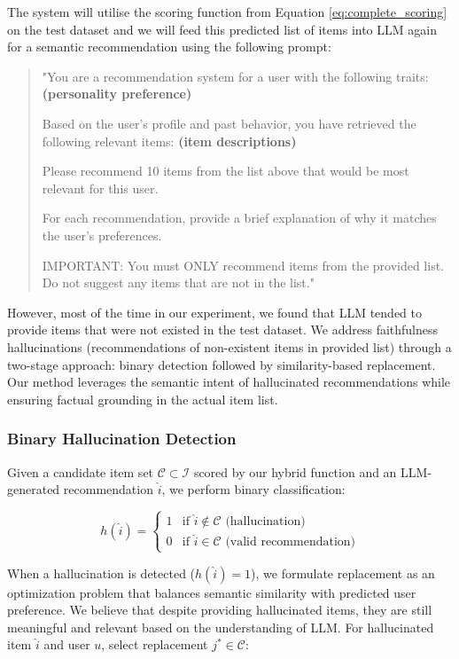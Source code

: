 \documentclass[acmsmall]{acmart}
\begin{document}
The system will utilise the scoring function from Equation \ref{eq:complete_scoring} on the test dataset and we will feed this predicted list of items into LLM again for a semantic recommendation using the following prompt: 
\begin{quote}
"You are a recommendation system for a user with the following traits:
\textbf{        (personality preference)}
        
        Based on the user's profile and past behavior, you have retrieved the following relevant items:
\textbf{        (item descriptions)}
        
        Please recommend 10 items from the list above that would be most relevant for this user.
        
        For each recommendation, provide a brief explanation of why it matches the user's preferences.
        
        IMPORTANT: You must ONLY recommend items from the provided list. Do not suggest any items that are not in the list."
\end{quote}
However, most of the time in our experiment, we found that LLM tended to provide items that were not existed in the test dataset. We address faithfulness hallucinations (recommendations of non-existent items in provided list) through a two-stage approach: binary detection followed by similarity-based replacement. Our method leverages the semantic intent of hallucinated recommendations while ensuring factual grounding in the actual item list.

\subsubsection{Binary Hallucination Detection}

Given a candidate item set $\mathcal{C} \subset \mathcal{I}$ scored by our hybrid function and an LLM-generated recommendation $\hat{i}$, we perform binary classification:

\begin{equation}
h(\hat{i}) = \begin{cases}
1 & \text{if } \hat{i} \notin \mathcal{C} \text{ (hallucination)} \\
0 & \text{if } \hat{i} \in \mathcal{C} \text{ (valid recommendation)}
\end{cases}
\label{eq:hallucination_detection}
\end{equation}



When a hallucination is detected ($h(\hat{i}) = 1$), we formulate replacement as an optimization problem that balances semantic similarity with predicted user preference. We believe that despite providing hallucinated items, they are still meaningful and relevant based on the understanding of LLM. 
For hallucinated item $\hat{i}$ and user $u$, select replacement $j^* \in \mathcal{C}$:
\end{document}
